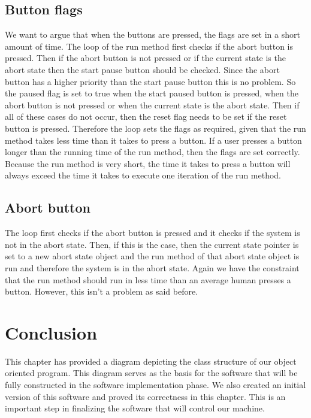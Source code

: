 \documentclass[a4paper,oneside,11pt]{article}
\begin{document}
\subsection{Button flags}
We want to argue that when the buttons are pressed, the flags are set in a short amount of time. The loop of the run method first checks if the abort button is pressed. Then if the abort button is not pressed or if the current state is the abort state then the start pause button should be checked. Since the abort button has a higher priority than the start pause button this is no problem. So the paused flag is set to true when the start paused button is pressed, when the abort button is not pressed or when the current state is the abort state. Then if all of these cases do not occur, then the reset flag needs to be set if the reset button is pressed. Therefore the loop sets the flags as required, given that the run method takes less time than it takes to press a button. If a user presses a button longer than the running time of the run method, then the flags are set correctly. Because the run method is very short, the time it takes to press a button will always exceed the time it takes to execute one iteration of the run method.

\subsection{Abort button}
The loop first checks if the abort button is pressed and it checks if the system is not in the abort state. Then, if this is the case, then the current state pointer is set to a new abort state object and the run method of that abort state object is run and therefore the system is in the abort state. Again we have the constraint that the run method should run in less time than an average human presses a button. However, this isn’t a problem as said before.

\section{Conclusion}
This chapter has provided a diagram depicting the class structure of our object oriented program. This diagram serves as the basis for the software that will be fully constructed in the software implementation phase. We also created an initial version of this software and proved its correctness in this chapter. This is an important step in finalizing the software that will control our machine.
\end{document}

